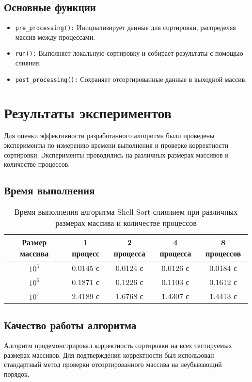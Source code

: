 \documentclass[12pt]{article}
\begin{document}
\subsection*{Основные функции}
\begin{itemize}
    \item \texttt{pre\_processing():} Инициализирует данные для сортировки, распределяя массив между процессами.
    \item \texttt{run():} Выполняет локальную сортировку и собирает результаты с помощью слияния.
    \item \texttt{post\_processing():} Сохраняет отсортированные данные в выходной массив.
\end{itemize}

\section*{Результаты экспериментов}
Для оценки эффективности разработанного алгоритма были проведены эксперименты по измерению времени выполнения и проверке корректности сортировки. Эксперименты проводились на различных размерах массивов и количестве процессов.

\subsection*{Время выполнения}
\label{subsec:execution_time}
\begin{table}[h]
    \centering
    \caption{Время выполнения алгоритма Shell Sort слиянием при различных размерах массива и количестве процессов}
    \begin{tabular}{|c|c|c|c|c|}
        \hline
        Размер массива & 1 процесс & 2 процесса & 4 процесса & 8 процессов \\
        \hline
        $10^5$ & 0.0145 с & 0.0124 с & 0.0126 с & 0.0184 с \\
        \hline
        $10^6$ & 0.1871 с & 0.1226 с & 0.1103 с & 0.1612 с \\
        \hline
        $10^7$ & 2.4189 с & 1.6768 с & 1.4307 с & 1.4413 с \\
        \hline
    \end{tabular}
\end{table}

\subsection*{Качество работы алгоритма}
\label{subsec:algorithm_quality}
Алгоритм продемонстрировал корректность сортировки на всех тестируемых размерах массивов. Для подтверждения корректности был использован стандартный метод проверки отсортированного массива на неубывающий порядок.
\end{document}
